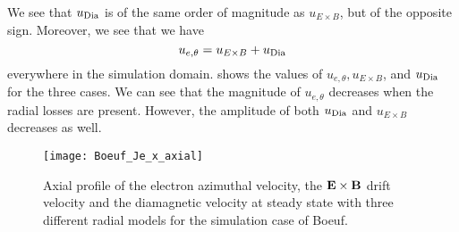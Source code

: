 We see that $u_{\rm Dia}$ is of the same order of magnitude as $u_{E \times B}$, but of the opposite sign.
Moreover, we see that we have 
$$ u_{e, \theta} =   u_{E \times B} + u_{\rm Dia}$$
everywhere in the simulation domain.
 shows the values of $ u_{e, \theta},   u_{E \times B}$, and $u_{\rm Dia}$ for the three cases.
We can see that the magnitude of $u_{e, \theta} $ decreases when the radial losses are present.
However, the amplitude of both $u_{\rm Dia}$ and $u_{E \times B}$ decreases as well.

 
\begin{figure}[hbtp]
  \centering
  \texttt{[image: Boeuf\_Je\_x\_axial]}
  \caption{Axial profile of the electron azimuthal velocity, the ${\mathbf E} \times {\mathbf B}$ drift velocity and the diamagnetic velocity at steady state with three different radial models for the simulation case of Boeuf.}
  \label{fig-Jetheta}
\end{figure}

